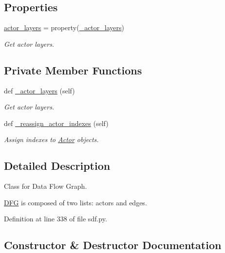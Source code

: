 \subsection*{Properties}
\begin{DoxyCompactItemize}
\item 
\hyperlink{classsylva_1_1base_1_1sdf_1_1_d_f_g_a55a9b08182b503823754256937227b9a}{actor\+\_\+layers} = property(\hyperlink{classsylva_1_1base_1_1sdf_1_1_d_f_g_a1e8c55f1e1a5cc595466e7b3bf3fd409}{\+\_\+actor\+\_\+layers})
\begin{DoxyCompactList}\small\item\em Get actor layers. \end{DoxyCompactList}\end{DoxyCompactItemize}
\subsection*{Private Member Functions}
\begin{DoxyCompactItemize}
\item 
def \hyperlink{classsylva_1_1base_1_1sdf_1_1_d_f_g_a1e8c55f1e1a5cc595466e7b3bf3fd409}{\+\_\+actor\+\_\+layers} (self)
\begin{DoxyCompactList}\small\item\em Get actor layers. \end{DoxyCompactList}\item 
def \hyperlink{classsylva_1_1base_1_1sdf_1_1_d_f_g_a80ccaab79271be0d90347c079a666719}{\+\_\+reassign\+\_\+actor\+\_\+indexes} (self)
\begin{DoxyCompactList}\small\item\em Assign indexes to \hyperlink{classsylva_1_1base_1_1sdf_1_1_actor}{Actor} objects. \end{DoxyCompactList}\end{DoxyCompactItemize}


\subsection{Detailed Description}
Class for Data Flow Graph. 

\hyperlink{classsylva_1_1base_1_1sdf_1_1_d_f_g}{D\+FG} is composed of two lists\+: actors and edges. 

Definition at line 338 of file sdf.\+py.



\subsection{Constructor \& Destructor Documentation}
\mbox{\label{classsylva_1_1base_1_1sdf_1_1_d_f_g_af005a65a522091fe22d2536bb16d1cf2}} 
